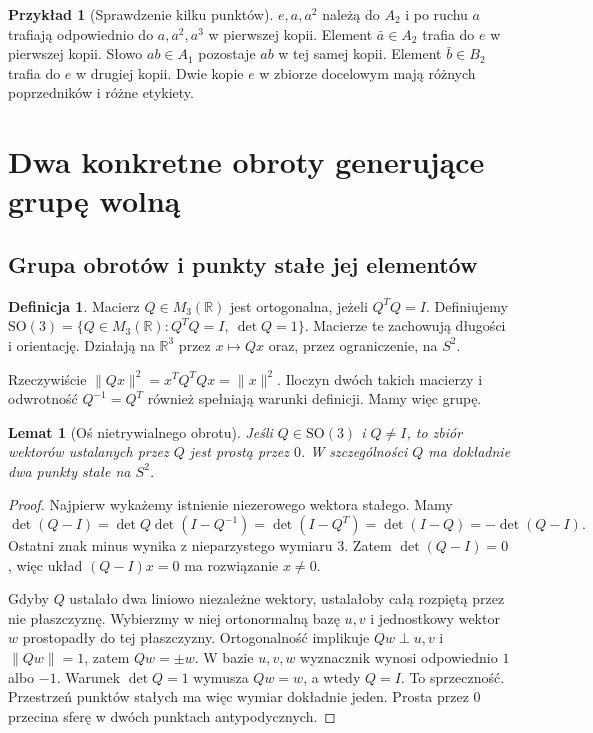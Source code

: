 \documentclass[11pt,a4paper]{article}
\numberwithin{equation}{section}
\theoremstyle{plain}
\newtheorem{lemat}[twierdzenie]{Lemat}
\theoremstyle{definition}
\newtheorem{definicja}[twierdzenie]{Definicja}
\newtheorem{przyklad}[twierdzenie]{Przykład}
\theoremstyle{remark}
\newcommand{\R}{\mathbb R}
\begin{document}
\begin{przyklad}[Sprawdzenie kilku punktów]
$e,a,a^2$ należą do $A_2$ i po ruchu $a$ trafiają odpowiednio do $a,a^2,a^3$ w pierwszej kopii. Element $\bar a\in A_2$ trafia do $e$ w pierwszej kopii. Słowo $ab\in A_1$ pozostaje $ab$ w tej samej kopii. Element $\bar b\in B_2$ trafia do $e$ w drugiej kopii. Dwie kopie $e$ w zbiorze docelowym mają różnych poprzedników i różne etykiety.
\end{przyklad}

\section{Dwa konkretne obroty generujące grupę wolną}
\subsection{Grupa obrotów i punkty stałe jej elementów}\label{subsec:so3}
\begin{definicja}
Macierz $Q\in M_3(\R)$ jest ortogonalna, jeżeli $Q^TQ=I$. Definiujemy $\mathrm{SO}(3)=\{Q\in M_3(\R):Q^TQ=I,\ \det Q=1\}$. Macierze te zachowują długości i orientację. Działają na $\R^3$ przez $x\mapsto Qx$ oraz, przez ograniczenie, na $S^2$.
\end{definicja}
Rzeczywiście $\|Qx\|^2=x^TQ^TQx=\|x\|^2$. Iloczyn dwóch takich macierzy i odwrotność $Q^{-1}=Q^T$ również spełniają warunki definicji. Mamy więc grupę.
\begin{lemat}[Oś nietrywialnego obrotu]\label{lem:os-obrotu}
Jeśli $Q\in\mathrm{SO}(3)$ i $Q\ne I$, to zbiór wektorów ustalanych przez $Q$ jest prostą przez $0$. W szczególności $Q$ ma dokładnie dwa punkty stałe na $S^2$.
\end{lemat}
\begin{proof}
Najpierw wykażemy istnienie niezerowego wektora stałego. Mamy
\[
 \det(Q-I)=\det Q\det(I-Q^{-1})=\det(I-Q^T)
 =\det(I-Q)=-\det(Q-I).
\]
Ostatni znak minus wynika z nieparzystego wymiaru $3$. Zatem $\det(Q-I)=0$, więc układ $(Q-I)x=0$ ma rozwiązanie $x\ne0$.

Gdyby $Q$ ustalało dwa liniowo niezależne wektory, ustalałoby całą rozpiętą przez nie płaszczyznę. Wybierzmy w niej ortonormalną bazę $u,v$ i jednostkowy wektor $w$ prostopadły do tej płaszczyzny. Ortogonalność implikuje $Qw\perp u,v$ i $\|Qw\|=1$, zatem $Qw=\pm w$. W bazie $u,v,w$ wyznacznik wynosi odpowiednio $1$ albo $-1$. Warunek $\det Q=1$ wymusza $Qw=w$, a wtedy $Q=I$. To sprzeczność. Przestrzeń punktów stałych ma więc wymiar dokładnie jeden. Prosta przez $0$ przecina sferę w dwóch punktach antypodycznych.
\end{proof}
\end{document}
